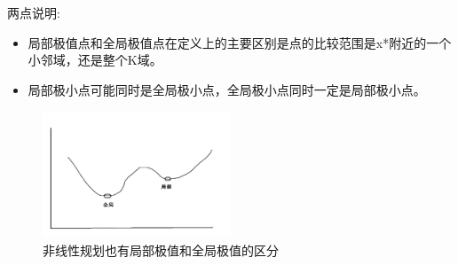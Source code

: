 两点说明:
\begin{itemize}
    \item 局部极值点和全局极值点在定义上的主要区别是点的比较范围是x*附近的一个小邻域，还是整个K域。
    \item 局部极小点可能同时是全局极小点，全局极小点同时一定是局部极小点。
\end{itemize}
\begin{figure}[H]
    \centering
    \includegraphics[width=0.5\textwidth]{./image/19.png}
    \caption{非线性规划也有局部极值和全局极值的区分}
    \label{fig:Chapter4_Temporary_Pavilion_1}
\end{figure}

